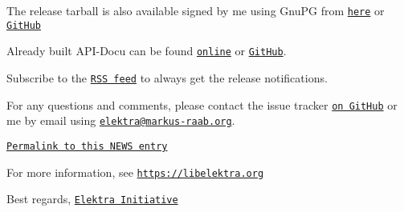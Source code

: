 The release tarball is also available signed by me using Gnu\+PG from \href{https://www.libelektra.org/ftp/elektra/releases/elektra-0.8.22.tar.gz.gpg}{\tt here} or \href{https://github.com/ElektraInitiative/ftp/blob/master/releases//elektra-0.8.22.tar.gz.gpg?raw=true}{\tt Git\+Hub}

Already built A\+P\+I-\/\+Docu can be found \href{https://doc.libelektra.org/api/0.8.22/html/}{\tt online} or \href{https://github.com/ElektraInitiative/doc/tree/master/api/0.8.22}{\tt Git\+Hub}.

Subscribe to the \href{https://www.libelektra.org/news/feed.rss}{\tt R\+SS feed} to always get the release notifications.

For any questions and comments, please contact the issue tracker \href{http://issues.libelektra.org}{\tt on Git\+Hub} or me by email using \href{mailto:elektra@markus-raab.org}{\tt elektra@markus-\/raab.\+org}.

\href{https://www.libelektra.org/news/0.8.22-release}{\tt Permalink to this N\+E\+WS entry}

For more information, see \href{https://libelektra.org}{\tt https\+://libelektra.\+org}

Best regards, \href{https://www.libelektra.org/developers/authors}{\tt Elektra Initiative} 